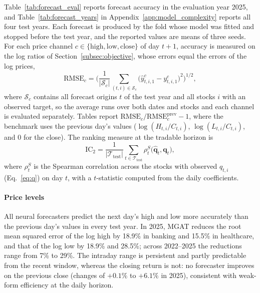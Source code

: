 \documentclass[pdflatex,sn-mathphys-num]{sn-jnl}%
\theoremstyle{thmstyleone}%
\theoremstyle{thmstyletwo}%
\theoremstyle{thmstylethree}%
\begin{document}
{\color{blue}Table~\ref{tab:forecast_eval} reports forecast accuracy in the evaluation year 2025, and Table~\ref{tab:forecast_years} in Appendix~\ref{app:model_complexity} reports all four test years. Each forecast is produced by the fold whose model was fitted and stopped before the test year, and the reported values are means of three seeds. For each price channel $c\in\{\mathrm{high},\mathrm{low},\mathrm{close}\}$ of day $t+1$, accuracy is measured on the log ratios of Section~\ref{subsec:objective}, whose errors equal the errors of the log prices,
\begin{equation}
\mathrm{RMSE}_c=\Big(\frac{1}{|\mathcal{S}_c|}\sum_{(t,i)\in\mathcal{S}_c}\big(\hat y^{c}_{t,i,1}-y^{c}_{t,i,1}\big)^2\Big)^{1/2},
\label{eq:rmse}
\end{equation}
where $\mathcal{S}_c$ contains all forecast origins $t$ of the test year and all stocks $i$ with an observed target, so the average runs over both dates and stocks and each channel is evaluated separately. Tables report $\mathrm{RMSE}_c/\mathrm{RMSE}^{\mathrm{prev}}_c-1$, where the benchmark uses the previous day's values ($\log(H_{t,i}/C_{t,i})$, $\log(L_{t,i}/C_{t,i})$, and 0 for the close). The ranking measure at the tradable horizon is
\begin{equation}
\mathrm{IC}_2=\frac{1}{|\mathcal{T}_{\mathrm{test}}|}\sum_{t\in\mathcal{T}_{\mathrm{test}}}\rho^{S}_t\big(\hat{\mathbf{q}}_t,\mathbf{q}_t\big),
\label{eq:ic2}
\end{equation}
where $\rho^{S}_t$ is the Spearman correlation across the stocks with observed $q_{t,i}$ (Eq.~\eqref{eq:q}) on day $t$, with a $t$-statistic computed from the daily coefficients.

\paragraph{Price levels}
All neural forecasters predict the next day's high and low more accurately than the previous day's values in every test year. In 2025, MGAT reduces the root mean squared error of the log high by 18.9\% in banking and 15.5\% in healthcare, and that of the log low by 18.9\% and 28.5\%; across 2022--2025 the reductions range from 7\% to 29\%. The intraday range is persistent and partly predictable from the recent window, whereas the closing return is not: no forecaster improves on the previous close (changes of $+0.1\%$ to $+6.1\%$ in 2025), consistent with weak-form efficiency at the daily horizon.

}
\end{document}

